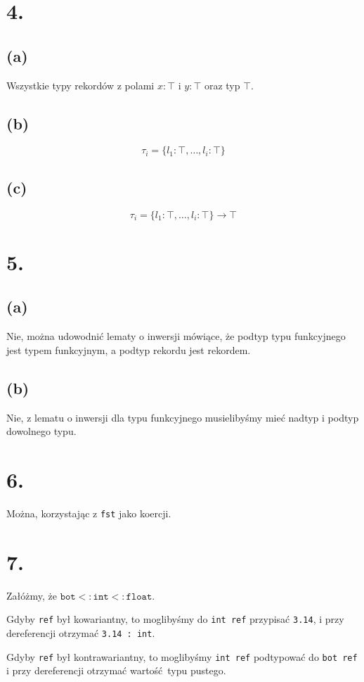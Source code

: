 \documentclass[a4paper, 12pt]{article}
\newcommand{\+}{\enspace}
\begin{document}
\section*{4.}
\subsection*{(a)}
Wszystkie typy rekordów z polami $x : ⊤$ i $y:⊤$ oraz typ $⊤$.

\subsection*{(b)}
$$τ_i = \{l_1:⊤,…,l_i:⊤\}$$

\subsection*{(c)}
$$τ_i = \{l_1:⊤,…,l_i:⊤\} → ⊤$$

\section*{5.}
\subsection{(a)}
Nie, można udowodnić lematy o inwersji mówiące,
że podtyp typu funkcyjnego jest typem funkcyjnym, a podtyp rekordu jest rekordem.

\subsection*{(b)}
Nie, z lematu o inwersji dla typu funkcyjnego musielibyśmy mieć nadtyp i podtyp dowolnego typu.

\section*{6.}
Można, korzystając z \texttt{fst} jako koercji.

\section*{7.}
Załóżmy, że $\texttt{bot} <: \texttt{int} <: \texttt{float}$.

Gdyby \texttt{ref} był kowariantny, to moglibyśmy do \texttt{int ref} przypisać \texttt{3.14},
i przy dereferencji otrzymać \texttt{3.14 : int}.

Gdyby \texttt{ref} był kontrawariantny, to moglibyśmy \texttt{int ref} podtypować do \texttt{bot ref}
i przy dereferencji otrzymać wartość typu pustego.
\end{document}
